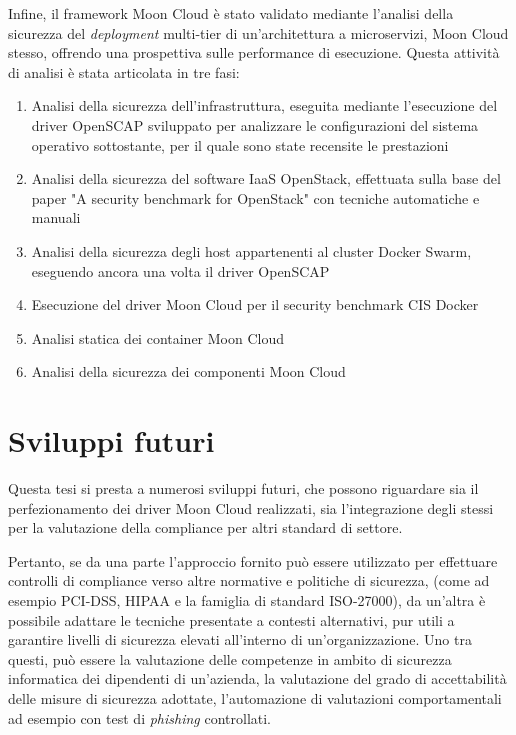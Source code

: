 \documentclass[../main.tex]{subfiles}
\begin{document}
Infine, il framework Moon Cloud è stato validato mediante l'analisi della sicurezza del \textit{deployment} multi-tier di un'architettura a microservizi, Moon Cloud stesso, offrendo una prospettiva sulle performance di esecuzione.
Questa attività di analisi è stata articolata in tre fasi:
\begin{enumerate}
    \item Analisi della sicurezza dell'infrastruttura, eseguita mediante l'esecuzione del driver OpenSCAP sviluppato per analizzare le configurazioni del sistema operativo sottostante, per il quale sono state recensite le prestazioni
    \item Analisi della sicurezza del software IaaS OpenStack, effettuata sulla base del paper "A security benchmark for OpenStack" con tecniche automatiche e manuali
    \item Analisi della sicurezza degli host appartenenti al cluster Docker Swarm, eseguendo ancora una volta il driver OpenSCAP
    \item Esecuzione del driver Moon Cloud per il security benchmark CIS Docker
    \item Analisi statica dei container Moon Cloud
    \item Analisi della sicurezza dei componenti Moon Cloud
\end{enumerate}




\section {Sviluppi futuri}
Questa tesi si presta a numerosi sviluppi futuri, che possono riguardare sia il perfezionamento dei driver Moon Cloud realizzati, sia l'integrazione degli stessi per la valutazione della compliance per altri standard di settore.

Pertanto, se da una parte l'approccio fornito può essere utilizzato per effettuare controlli di compliance verso altre normative e politiche di sicurezza, (come ad esempio PCI-DSS, HIPAA e la famiglia di standard ISO-27000), da un'altra è possibile adattare le tecniche presentate a contesti alternativi, pur utili a garantire livelli di sicurezza elevati all'interno di un'organizzazione.
Uno tra questi, può essere la valutazione delle competenze in ambito di sicurezza informatica dei dipendenti di un'azienda, la valutazione del grado di accettabilità delle misure di sicurezza adottate, l'automazione di valutazioni comportamentali ad esempio con test di \textit{phishing} controllati.
\end{document}

